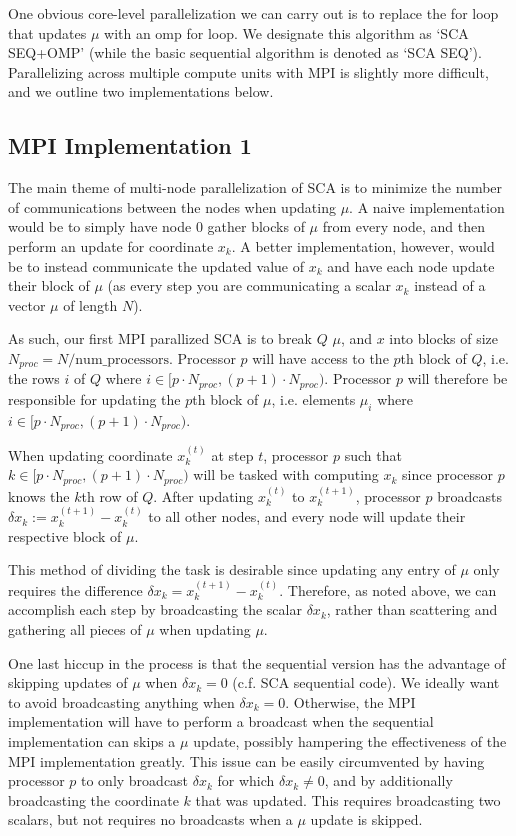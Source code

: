 \documentclass{article}
\begin{document}
One obvious core-level parallelization we can carry out is to replace the for loop that updates $\mu$ with an omp for loop. We designate this algorithm as `SCA SEQ+OMP' (while the basic sequential algorithm is denoted as `SCA SEQ'). Parallelizing across multiple compute units with MPI is slightly more difficult, and we outline two implementations below.

\subsection{MPI Implementation 1}
The main theme of multi-node parallelization of SCA is to minimize the number of communications between the nodes when updating $\mu$. A naive implementation would be to simply have node 0 gather blocks of $\mu$ from every node, and then perform an update for coordinate $x_k$. A better implementation, however, would be to instead communicate the updated value of $x_k$ and have each node update their block of $\mu$ (as every step you are communicating a scalar $x_k$ instead of a vector $\mu$ of length $N$).

As such, our first MPI parallized SCA is to break $Q$ $\mu$, and $x$ into blocks of size $N_{proc} = N/\text{num\_processors}$. Processor $p$ will have access to the $p$th block of $Q$, i.e. the rows $i$ of $Q$ where $i \in [p \cdot N_{proc}, (p+1) \cdot N_{proc} )$. Processor $p$ will therefore be responsible for updating the $p$th block of $\mu$, i.e. elements $\mu_i$ where $i \in [p \cdot N_{proc}, (p+1) \cdot N_{proc} )$.

When updating coordinate $x_k^{(t)}$ at step $t$, processor $p$ such that $k \in [p \cdot N_{proc}, (p+1) \cdot N_{proc} )$ will be tasked with computing $x_k$ since processor $p$ knows the $k$th row of $Q$. After updating $x_k^{(t)}$ to $x_k^{(t+1)}$, processor $p$ broadcasts $\delta x_k := x_k^{(t+1)} - x_k^{(t)}$ to all other nodes, and every node will update their respective block of $\mu$.

This method of dividing the task is desirable since updating any entry of $\mu$ only requires the difference $\delta x_k = x_k^{(t+1)} - x_k^{(t)}$. Therefore, as noted above, we can accomplish each step by broadcasting the scalar $\delta x_k$, rather than scattering and gathering all pieces of $\mu$ when updating $\mu$.

One last hiccup in the process is that the sequential version has the advantage of skipping updates of $\mu$ when $\delta x_k = 0$ (c.f. SCA sequential code). We ideally want to avoid broadcasting anything when $\delta x_k = 0$. Otherwise, the MPI implementation will have to perform a broadcast when the sequential implementation can skips a $\mu$ update, possibly hampering the effectiveness of the MPI implementation greatly. This issue can be easily circumvented by having processor $p$ to only broadcast $\delta x_k$ for which $\delta x_k \neq 0$, and by additionally broadcasting the coordinate $k$ that was updated. This requires broadcasting two scalars, but not requires no broadcasts when a $\mu$ update is skipped.
\end{document}
